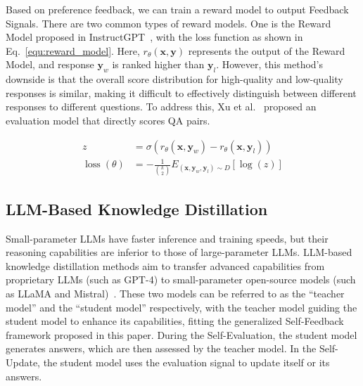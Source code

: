 \documentclass[lettersize,journal]{IEEEtran}
\begin{document}
Based on preference feedback, we can train a reward model to output Feedback Signals. There are two common types of reward models. One is the Reward Model proposed in InstructGPT~\cite{InstructGPT}, with the loss function as shown in Eq.~\ref{equ:reward_model}. Here, $r_\theta(\boldsymbol{x}, \boldsymbol{y})$ represents the output of the Reward Model, and response $\boldsymbol{y}_w$ is ranked higher than $\boldsymbol{y}_l$. However, this method's downside is that the overall score distribution for high-quality and low-quality responses is similar, making it difficult to effectively distinguish between different responses to different questions. To address this, Xu et al.~\cite{SelfCritique_24_arXiv_Zhipu} proposed an evaluation model that directly scores QA pairs.

\begin{equation}\label{equ:reward_model}
\begin{aligned}
z &= \sigma\left(r_\theta\left(\boldsymbol{x}, \boldsymbol{y}_w\right) - r_\theta\left(\boldsymbol{x}, \boldsymbol{y}_l\right)\right) \\
\operatorname{loss}(\theta) &= -\frac{1}{\binom{k}{2}} E_{\left(\boldsymbol{x}, \boldsymbol{y}_w, \boldsymbol{y}_l\right) \sim D}\left[\log \left(z\right)\right]
\end{aligned}
\end{equation}




\subsection{LLM-Based Knowledge Distillation} \label{subsec:KD}


\noindent Small-parameter LLMs have faster inference and training speeds, but their reasoning capabilities are inferior to those of large-parameter LLMs. LLM-based knowledge distillation methods aim to transfer advanced capabilities from proprietary LLMs (such as GPT-4) to small-parameter open-source models (such as LLaMA and Mistral)~\cite{SurveyKD_24_arXiv_HKU}. These two models can be referred to as the ``teacher model'' and the ``student model'' respectively, with the teacher model guiding the student model to enhance its capabilities, fitting the generalized Self-Feedback framework proposed in this paper. During the Self-Evaluation, the student model generates answers, which are then assessed by the teacher model. In the Self-Update, the student model uses the evaluation signal to update itself or its answers.
\end{document}
